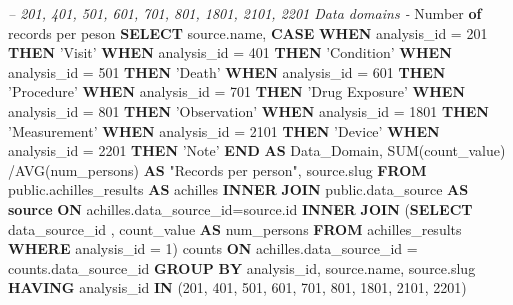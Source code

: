 \documentclass[]{book}
\newenvironment{Shaded}{\begin{snugshade}}{\end{snugshade}}
\newcommand{\KeywordTok}[1]{\textcolor[rgb]{0.13,0.29,0.53}{\textbf{#1}}}
\newcommand{\DataTypeTok}[1]{\textcolor[rgb]{0.13,0.29,0.53}{#1}}
\newcommand{\DecValTok}[1]{\textcolor[rgb]{0.00,0.00,0.81}{#1}}
\newcommand{\StringTok}[1]{\textcolor[rgb]{0.31,0.60,0.02}{#1}}
\newcommand{\CommentTok}[1]{\textcolor[rgb]{0.56,0.35,0.01}{\textit{#1}}}
\newcommand{\OtherTok}[1]{\textcolor[rgb]{0.56,0.35,0.01}{#1}}
\newcommand{\FunctionTok}[1]{\textcolor[rgb]{0.00,0.00,0.00}{#1}}
\newcommand{\NormalTok}[1]{#1}
\begin{document}
\begin{Shaded}
\begin{Highlighting}[]
\CommentTok{-- 201, 401, 501, 601, 701, 801, 1801, 2101, 2201   Data domains - }
    \DataTypeTok{Number} \KeywordTok{of}\NormalTok{ records per peson}
\KeywordTok{SELECT} 
\NormalTok{    source.name,}
    \KeywordTok{CASE} 
      \KeywordTok{WHEN}\NormalTok{ analysis_id = }\DecValTok{201} \KeywordTok{THEN} \StringTok{'Visit'}
      \KeywordTok{WHEN}\NormalTok{ analysis_id = }\DecValTok{401} \KeywordTok{THEN} \StringTok{'Condition'}
      \KeywordTok{WHEN}\NormalTok{ analysis_id = }\DecValTok{501} \KeywordTok{THEN} \StringTok{'Death'}
      \KeywordTok{WHEN}\NormalTok{ analysis_id = }\DecValTok{601} \KeywordTok{THEN} \StringTok{'Procedure'}
      \KeywordTok{WHEN}\NormalTok{ analysis_id = }\DecValTok{701} \KeywordTok{THEN} \StringTok{'Drug Exposure'}
      \KeywordTok{WHEN}\NormalTok{ analysis_id = }\DecValTok{801} \KeywordTok{THEN} \StringTok{'Observation'}
      \KeywordTok{WHEN}\NormalTok{ analysis_id = }\DecValTok{1801} \KeywordTok{THEN} \StringTok{'Measurement'}
      \KeywordTok{WHEN}\NormalTok{ analysis_id = }\DecValTok{2101} \KeywordTok{THEN} \StringTok{'Device'}
      \KeywordTok{WHEN}\NormalTok{ analysis_id = }\DecValTok{2201} \KeywordTok{THEN} \StringTok{'Note'}
    \KeywordTok{END} \KeywordTok{AS}\NormalTok{ Data_Domain,}
    \FunctionTok{SUM}\NormalTok{(count_value) /AVG(num_persons) }\KeywordTok{AS} \OtherTok{"Records per person"}\NormalTok{,}
\NormalTok{    source.slug}
\KeywordTok{FROM}\NormalTok{ public.achilles_results }\KeywordTok{AS}\NormalTok{ achilles }\KeywordTok{INNER} \KeywordTok{JOIN} 
\NormalTok{    public.data_source }\KeywordTok{AS} \KeywordTok{source} \KeywordTok{ON}\NormalTok{ achilles.data_source_id=source.id}
\KeywordTok{INNER} \KeywordTok{JOIN}\NormalTok{ (}\KeywordTok{SELECT}\NormalTok{ data_source_id , count_value }\KeywordTok{AS}\NormalTok{ num_persons }\KeywordTok{FROM} 
\NormalTok{    achilles_results }\KeywordTok{WHERE}\NormalTok{ analysis_id = }\DecValTok{1}\NormalTok{) counts}
\KeywordTok{ON}\NormalTok{ achilles.data_source_id = counts.data_source_id }
\KeywordTok{GROUP} \KeywordTok{BY}\NormalTok{ analysis_id, source.name, source.slug}
\KeywordTok{HAVING}\NormalTok{ analysis_id }\KeywordTok{IN}\NormalTok{ (}\DecValTok{201}\NormalTok{, }\DecValTok{401}\NormalTok{, }\DecValTok{501}\NormalTok{, }\DecValTok{601}\NormalTok{, }\DecValTok{701}\NormalTok{, }\DecValTok{801}\NormalTok{, }\DecValTok{1801}\NormalTok{, }\DecValTok{2101}\NormalTok{, }
    \DecValTok{2201}\NormalTok{)}
\end{Highlighting}
\end{Shaded}


\end{document}
